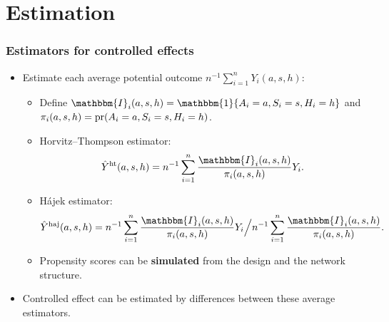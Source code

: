 \documentclass[aspectratio=169]{beamer}
\newcommand{\pr}{\textup{pr}}
\newcommand{\sumi}{\sum_{i=1}^n}
\newcommand{\horthom}{\textup{ht}}
\newcommand{\haj}{\textup{haj}}
\newcommand{\indicator}{\mathbbm{1}}
\newcommand{\bbI}{\mathbbm{I}}
\newcommand{\pscore}[1]{\pi_{#1}}
\begin{document}
\section{Estimation}
\begin{frame}
\frametitle{Estimators for controlled effects}
\begin{itemize}
    \item Estimate each average potential outcome $n^{-1}\sumi Y_i(a,s,h)$:
    \pause 
    \begin{itemize}
        \item Define $\bbI_{i}(a,s,h)=\indicator\{A_{i}=a,S_{i}=s,H_{i}=h\}$ and $\pscore{i}(a,s,h)=\pr(A_{i}=a, S_{i}=s, H_{i}=h)$.
        \pause 
        
        \item Horvitz--Thompson estimator: 
        $$\hat{Y}^{\horthom}(a,s,h) = n^{-1}\sumi\frac{\bbI_{i}(a,s,h)}{\pscore{i}(a,s,h)}Y_i.$$
        \pause 
        
        \item H\'{a}jek estimator:
        $$\hat{Y}^{\haj}(a,s,h) = n^{-1}\sumi\frac{\bbI_{i}(a,s,h)}{\pscore{i}(a,s,h)}Y_i \Big / n^{-1}\sumi\frac{\bbI_{i}(a,s,h)}{\pscore{i}(a,s,h)}.$$
        \pause 
        
        \item Propensity scores can be \textbf{simulated} from the design and the network structure. 
        \pause 
    \end{itemize}
    \item Controlled effect can be estimated by differences between these average estimators.
\end{itemize}
\end{frame}
\end{document}
